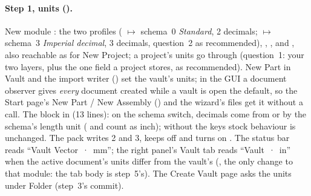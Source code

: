 \paragraph{Step 1, units ().} New module : the two
profiles ( $\mapsto$ schema~0 \emph{Standard}, 2 decimals;  $\mapsto$ schema~3 \emph{Imperial
decimal}, 3 decimals, question~2 as recommended), , ,
 and , also reachable as
 for New Project; a project's units go through
 (question~1: your two layers, plus the one field a project stores, as
recommended). New Part in Vault and the import writer ()
set the vault's units; in the GUI a document observer gives \emph{every} document created while a vault is
open the default, so the Start page's New Part / New Assembly () and the wizard's files get it
without a call. The \code{[BW]} block in  (13 lines): on the schema switch, decimals
come from  or  by the schema's length unit ( and
 count as inch); without the keys stock behaviour is unchanged. The pack writes 2 and 3, keeps
 off and turns on . The status bar
reads ``Vault Vector~·~mm''; the right panel's Vault tab reads ``Vault~·~in'' when the active document's units
differ from the vault's (, the only change to that module: the tab body is
step~5's). The Create Vault page asks the units under Folder (step~3's commit).

